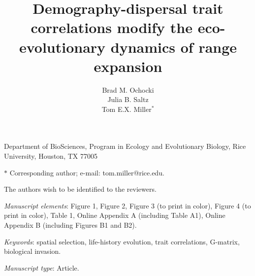 \documentclass[11pt]{article}
\title{Demography-dispersal trait correlations modify the eco-evolutionary dynamics of range expansion}
\author{Brad M. Ochocki \\
Julia B. Saltz \\
Tom E.X. Miller$^{\ast}$}
\date{}
\begin{document}
\maketitle

\noindent{} Department of BioSciences, Program in Ecology and Evolutionary Biology, Rice University, Houston, TX 77005

\noindent{} $\ast$ Corresponding author; e-mail: tom.miller@rice.edu.

\bigskip

\noindent{} The authors wish to be identified to the reviewers.

\bigskip

\noindent{} \textit{Manuscript elements}: Figure 1, Figure 2, Figure 3 (to print in color), Figure 4 (to print in color), Table 1, Online Appendix A (including Table A1), Online Appendix B (including Figures B1 and B2).

\bigskip

\noindent{} \textit{Keywords}: spatial selection, life-history evolution, trait correlations, G-matrix, biological invasion.

\bigskip

\noindent{} \textit{Manuscript type}: Article.

\bigskip


\linenumbers{}
\modulolinenumbers[2]

\newpage{}

\end{document}
